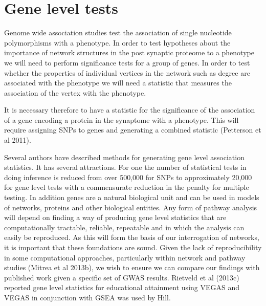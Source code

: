 \section{Gene level tests}
Genome wide association studies test the association of single nucleotide polymorphisms with a phenotype.
In order to test hypotheses about the importance of network structures in the post synaptic proteome to a phenotype we will need to perform significance tests for a group of genes. In order to test whether the properties of individual vertices in the network such as degree are associated with the phenotype we will need a statistic that measures the association of the vertex with the phenotype.  

It is necessary therefore to have a statistic for the significance of the association of a gene encoding a protein in the synaptome with a phenotype. This will require assigning SNPs to genes and generating a combined statistic (Petterson et al 2011).

Several authors have described methods for generating gene level association statistics. It has several attractions. For one the number of statistical tests in doing inference is reduced from over 500,000 for SNPs to approximately 20,000 for gene level tests with a commensurate reduction in the penalty for multiple testing. In addition genes are a natural biological unit and can be used in models of networks, proteins and other biological entities. Any form of pathway analysis will depend on finding a way of producing gene level statistics that are computationally tractable, reliable, repeatable and in which the analysis can easily be reproduced. As this will form the basis of our interrogation of networks, it is important that these foundations are sound. Given the lack of reproducibility in some computational approaches, particularly within network and pathway studies (Mitrea et al 2013b), we wish to ensure we can compare our findings with published work given a specific set of GWAS results.
Rietveld et al (2013c) reported gene level statistics for educational attainment using VEGAS and VEGAS in conjunction with GSEA was used by Hill. 

